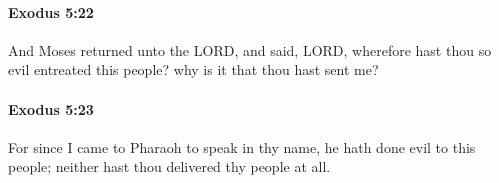 		\paragraph{Exodus 5:22} %
			\label{EXODUS-5-22}

			And Moses returned unto the LORD, and said, LORD, wherefore hast thou so evil entreated this people? why is it that thou hast sent me?


		\paragraph{Exodus 5:23} %
			\label{EXODUS-5-23}

			For since I came to Pharaoh to speak in thy name, he hath done evil to this people; neither hast thou delivered thy people at all.

